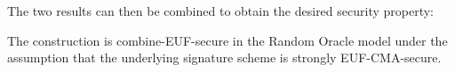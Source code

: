   The two results can then be combined to obtain the desired security property:

  \begin{theorem}
    \label{thm:combsign}
    The construction  is \textsf{combine-EUF}-secure in the Random
    Oracle model under the assumption that the underlying signature scheme is
    strongly \textsf{EUF-CMA}-secure.
  \end{theorem}

